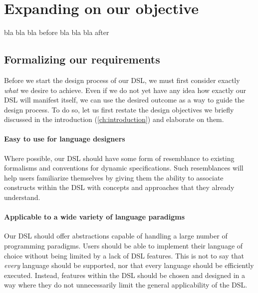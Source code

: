 
\chapter{\label{ch:design_requirements}Expanding on our objective}
bla bla bla before bla bla bla after

\section{Formalizing our requirements}
\label{sec:design_requirements}
Before we start the design process of our \ac{DSL}, we must first consider exactly \textit{what} we desire to achieve. Even if we do not yet have any idea how exactly our \ac{DSL} will manifest itself, we can use the desired outcome as a way to guide the design process. To do so, let us first restate the design objectives we briefly discussed in the introduction (\cref{ch:introduction}) and elaborate on them. \\

\subsubsection*{Easy to use for language designers}
Where possible, our \ac{DSL} should have some form of resemblance to existing formalisms and conventions for dynamic specifications. Such resemblances will help users familiarize themselves by giving them the ability to associate constructs within the \ac{DSL} with concepts and approaches that they already understand.

\subsubsection*{Applicable to a wide variety of language paradigms}
Our \ac{DSL} should offer abstractions capable of handling a large number of programming paradigms. Users should be able to implement their language of choice without being limited by a lack of \ac{DSL} features. This is not to say that \textit{every} language should be supported, nor that every language should be efficiently executed. Instead, features within the \ac{DSL} should be chosen and designed in a way where they do not unnecessarily limit the general applicability of the \ac{DSL}.

